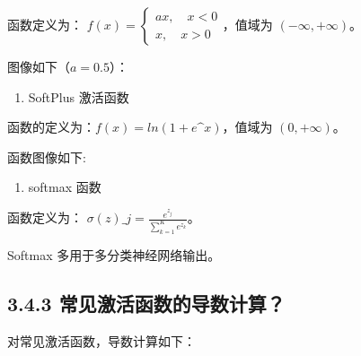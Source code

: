 函数定义为： $ f(x) = \left\{

\begin{aligned}
   ax, \quad x<0 \\
   x, \quad x>0
   \end{aligned}

\right. $，值域为 $ (-∞,+∞) $。

图像如下（$ a = 0.5 $）：

 

\begin{enumerate}
\def\labelenumi{\arabic{enumi}.}
\setcounter{enumi}{4}
 
\item
  SoftPlus 激活函数
\end{enumerate}

函数的定义为：$ f(x) = ln( 1 + e\^{}x) $，值域为 $ (0,+∞) $。

函数图像如下:

 

\begin{enumerate}
\def\labelenumi{\arabic{enumi}.}
\setcounter{enumi}{5}
 
\item
  softmax 函数
\end{enumerate}

函数定义为： $ \sigma(z)\_j = \frac{e^{z_j}}{\sum_{k=1}^K e^{z_k}} $。

Softmax 多用于多分类神经网络输出。

\subsection{3.4.3
常见激活函数的导数计算？}\label{ux5e38ux89c1ux6fc0ux6d3bux51fdux6570ux7684ux5bfcux6570ux8ba1ux7b97}

对常见激活函数，导数计算如下：

